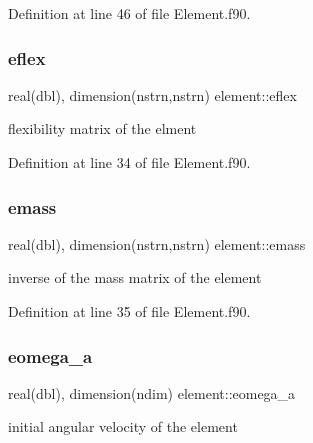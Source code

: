 Definition at line 46 of file Element.\+f90.

\mbox{\label{namespaceelement_a5cd41224c84f496a89d157c781b0d207}} 
\subsubsection{\texorpdfstring{eflex}{eflex}}
{\footnotesize\ttfamily real(dbl), dimension(nstrn,nstrn) element\+::eflex\hspace{0.3cm}{\ttfamily [private]}}



flexibility matrix of the elment 



Definition at line 34 of file Element.\+f90.

\mbox{\label{namespaceelement_acd7a12a677d8157d3f792f2090fd0664}} 
\subsubsection{\texorpdfstring{emass}{emass}}
{\footnotesize\ttfamily real(dbl), dimension(nstrn,nstrn) element\+::emass\hspace{0.3cm}{\ttfamily [private]}}



inverse of the mass matrix of the element 



Definition at line 35 of file Element.\+f90.

\mbox{\label{namespaceelement_a8d354f7c393ef7f0ba4144a20b5390ba}} 
\subsubsection{\texorpdfstring{eomega\+\_\+a}{eomega\_a}}
{\footnotesize\ttfamily real(dbl), dimension(ndim) element\+::eomega\+\_\+a\hspace{0.3cm}{\ttfamily [private]}}



initial angular velocity of the element 



